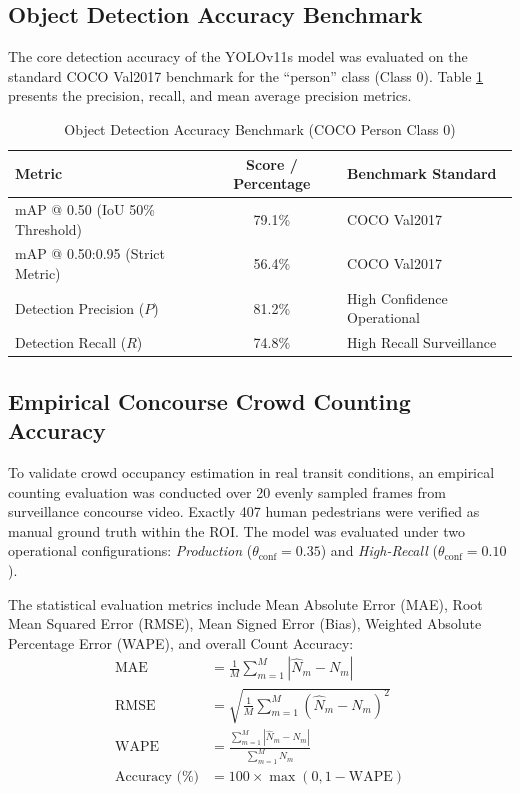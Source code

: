 \documentclass[12pt,a4paper]{report}
\begin{document}
\subsection{Object Detection Accuracy Benchmark}
The core detection accuracy of the YOLOv11s model was evaluated on the standard COCO Val2017 benchmark for the ``person'' class (Class 0). Table \ref{tab:coco_bench} presents the precision, recall, and mean average precision metrics.

\begin{table}[H]
\centering
\caption{Object Detection Accuracy Benchmark (COCO Person Class 0)}
\label{tab:coco_bench}
\vspace*{5pt}
\begin{tabular}{|l|c|l|}
\hline
\textbf{Metric} & \textbf{Score / Percentage} & \textbf{Benchmark Standard} \\ \hline
mAP @ 0.50 (IoU 50\% Threshold) & 79.1\% & COCO Val2017 \\ \hline
mAP @ 0.50:0.95 (Strict Metric) & 56.4\% & COCO Val2017 \\ \hline
Detection Precision ($P$) & 81.2\% & High Confidence Operational \\ \hline
Detection Recall ($R$) & 74.8\% & High Recall Surveillance \\ \hline
\end{tabular}
\end{table}

\subsection{Empirical Concourse Crowd Counting Accuracy}
To validate crowd occupancy estimation in real transit conditions, an empirical counting evaluation was conducted over 20 evenly sampled frames from surveillance concourse video. Exactly 407 human pedestrians were verified as manual ground truth within the ROI. The model was evaluated under two operational configurations: \emph{Production} ($\theta_{\text{conf}} = 0.35$) and \emph{High-Recall} ($\theta_{\text{conf}} = 0.10$).

The statistical evaluation metrics include Mean Absolute Error (MAE), Root Mean Squared Error (RMSE), Mean Signed Error (Bias), Weighted Absolute Percentage Error (WAPE), and overall Count Accuracy:
\begin{align}
    \text{MAE} &= \frac{1}{M} \sum_{m=1}^{M} \left| \hat{N}_m - N_m \right| \\
    \text{RMSE} &= \sqrt{ \frac{1}{M} \sum_{m=1}^{M} \left( \hat{N}_m - N_m \right)^2 } \\
    \text{WAPE} &= \frac{\sum_{m=1}^{M} \left| \hat{N}_m - N_m \right|}{\sum_{m=1}^{M} N_m} \\
    \text{Accuracy (\%)} &= 100 \times \max\left( 0, 1 - \text{WAPE} \right)
\end{align}
\end{document}
